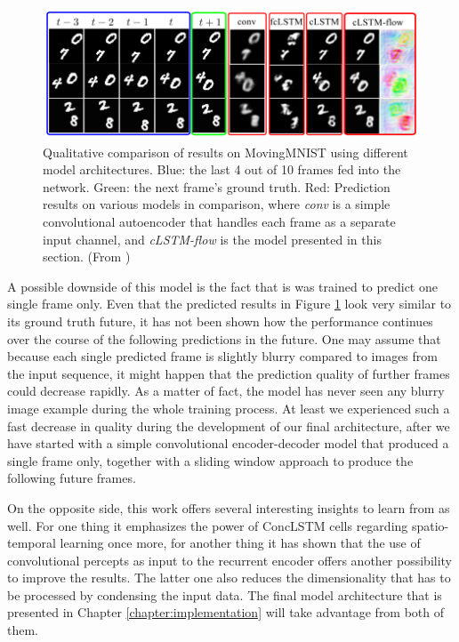\begin{figure}[htb]
	\centering
	\includegraphics[width=1.0\linewidth]{figures/related/spat_temp_results.png} 
	\caption[Qualitative MovingMNIST Results of LSTM Models]{Qualitative comparison of results on MovingMNIST using different model architectures. Blue: the last 4 out of 10 frames fed into the network. Green: the next frame's ground truth. Red: Prediction results on various models in comparison, where \textit{conv} is a simple convolutional autoencoder that handles each frame as a separate input channel, and \textit{cLSTM-flow} is the model presented in this section. (From \parencite{spat_temp_video_autoenc})} \label{fig:spatiotemp_results}
\end{figure}

A possible downside of this model is the fact that is was trained to predict one single frame only. Even that the predicted results in Figure \ref{fig:spatiotemp_results} look very similar to its ground truth future, it has not been shown how the performance continues over the course of the following predictions in the future. One may assume that because each single predicted frame is slightly blurry compared to images from the input sequence, it might happen that the prediction quality of further frames could decrease rapidly. As a matter of fact, the model has never seen any blurry image example during the whole training process. At least we experienced such a fast decrease in quality during the development of our final architecture, after we have started with a simple convolutional encoder-decoder model that produced a single frame only, together with a sliding window approach to produce the following future frames.

On the opposite side, this work offers several interesting insights to learn from as well. For one thing it emphasizes the power of ConcLSTM cells regarding spatio-temporal learning once more, for another thing it has shown that the use of convolutional percepts as input to the recurrent encoder offers another possibility to improve the results. The latter one also reduces the dimensionality that has to be processed by condensing the input data. The final model architecture that is presented in Chapter \ref{chapter:implementation} will take advantage from both of them.


